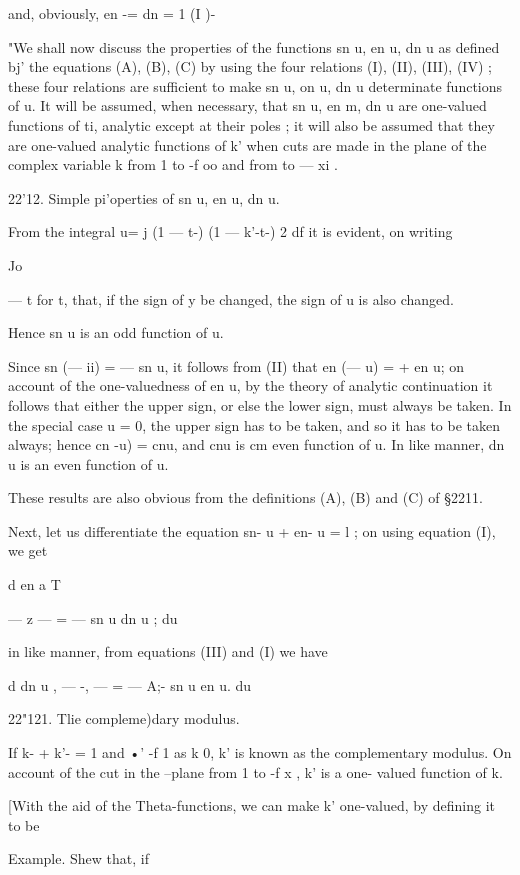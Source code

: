 and, obviously, en -= dn = 1 (I )- 

"We shall now discuss the properties of the functions sn u, en u, dn u as defined bj' the 
equations (A), (B), (C) by using the four relations (I), (II), (III), (IV) ; these four relations 
are sufficient to make sn u, on u, dn u determinate functions of u. It will be assumed, 
when necessary, that sn u, en m, dn u are one-valued functions of ti, analytic except at their 
poles ; it will also be assumed that they are one-valued analytic functions of k'  when cuts 
are made in the plane of the complex variable k  from 1 to -f oo and from to — xi . 

22'12. Simple pi'operties of sn u, en u, dn u. 

From the integral u= j (1 — t-)   (1 — k'-t-) 2 df  it is evident, on writing 

Jo 

— t for t, that, if the sign of y be changed, the sign of u is also changed. 

Hence sn u is an odd function of u. 

Since sn (— ii) = — sn u, it follows from (II) that en (— u) = + en u; on 
account of the one-valuedness of en u, by the theory of analytic continuation 
it follows that either the upper sign, or else the lower sign, must always be 
taken. In the special case u = 0, the upper sign has to be taken, and so it 
has to be taken always; hence cn -u) = cnu, and cnu is cm even function 
of u. In like manner, dn u is an even function of u. 

These results are also obvious from the definitions (A), (B) and (C) of 
§2211. 

Next, let us differentiate the equation sn- u + en- u = l ; on using equation 
(I), we get 

d en a T 

— z — = — sn u dn u ; 
du 

in like manner, from equations (III) and (I) we have 

d dn u ,   
— -, — = — A;- sn u en u. 
du 

22"121. Tlie compleme)dary modulus. 

If k- + k'- = 1 and  •'   -f 1 as k   0, k' is known as the complementary 
modulus. On account of the cut in the   --plane from 1 to -f x , k' is a one- 
valued function of k. 

[With the aid of the Theta-functions, we can make k'  one-valued, by defining it to be 

Example. Shew that, if 

